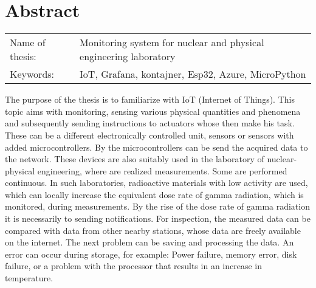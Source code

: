 \documentclass[../main.tex]{subfiles} %
\begin{document}
\newpage
\vspace*{6cm}
\section*{Abstract}


\noindent


\begingroup
\setlength{\tabcolsep}{12pt} %
\renewcommand{\arraystretch}{1.3} %
\begin{table}[h!]
\begin{tabular}{ l l  }
Name of thesis: &  Monitoring system for nuclear and physical engineering laboratory \\
Keywords:  &  IoT, Grafana, kontajner, Esp32, Azure, MicroPython \\
\end{tabular}
\end{table}
\endgroup

 The purpose of the thesis is to familiarize with IoT (Internet of Things).
This topic aims with monitoring, sensing various physical quantities and phenomena and subsequently  sending instructions to actuators whose then make his task.
These can be a different electronically controlled unit, sensors or sensors with added microcontrollers.
By the microcontrollers can be send the acquired data to the network.
These devices are also suitably used in the laboratory of nuclear-physical engineering, where are realized measurements. Some are performed continuous.
In such laboratories, radioactive materials with low activity are used, which can locally increase the equivalent dose rate of gamma radiation, which is monitored, during measurements. By the rise of the dose rate of gamma radiation it is necessarily to sending notifications. For inspection, the measured data can be compared with data from other nearby stations,
whose data are freely available on the internet.
The next problem can be saving and processing the data.
An error can occur during storage, for example: Power failure, memory error, disk failure, or a problem with the processor that results in an increase in temperature.

    
\end{document}
